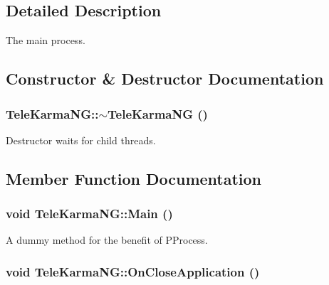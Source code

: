 \subsection{Detailed Description}
The main process. 

\subsection{Constructor \& Destructor Documentation}
\hypertarget{classTeleKarmaNG_a0decf4d37075fe5a6ca8009996f9cce}{
\subsubsection[{$\sim$TeleKarmaNG}]{\setlength{\rightskip}{0pt plus 5cm}TeleKarmaNG::$\sim$TeleKarmaNG ()}}
\label{classTeleKarmaNG_a0decf4d37075fe5a6ca8009996f9cce}


Destructor waits for child threads. 



\subsection{Member Function Documentation}
\hypertarget{classTeleKarmaNG_9e2c67bec8a3794e755ee1d91a18a9fa}{
\subsubsection[{Main}]{\setlength{\rightskip}{0pt plus 5cm}void TeleKarmaNG::Main ()}}
\label{classTeleKarmaNG_9e2c67bec8a3794e755ee1d91a18a9fa}


A dummy method for the benefit of PProcess. 

\hypertarget{classTeleKarmaNG_54349ac49ff1575dfd1b158ef0842895}{
\subsubsection[{OnCloseApplication}]{\setlength{\rightskip}{0pt plus 5cm}void TeleKarmaNG::OnCloseApplication ()}}
\label{classTeleKarmaNG_54349ac49ff1575dfd1b158ef0842895}


